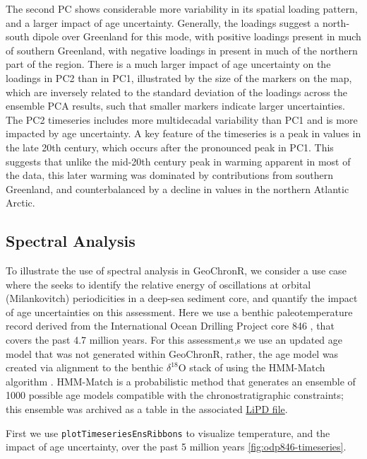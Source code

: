 \documentclass[gchron, manuscript]{copernicus}
\begin{document}
The second PC shows considerable more variability in its spatial loading pattern, and a larger impact of age uncertainty.
Generally, the loadings suggest a north-south dipole over Greenland for this mode, with positive loadings present in much of southern Greenland, with negative loadings in present in much of the northern part of the region.
There is a much larger impact of age uncertainty on the loadings in PC2 than in PC1, illustrated by the size of the markers on the map, which are inversely related to the standard deviation of the loadings across the ensemble PCA results, such that smaller markers indicate larger uncertainties.
The PC2 timeseries includes more multidecadal variability than PC1 and is more impacted by age uncertainty.
A key feature of the timeseries is a peak in values in the late 20th century, which occurs after the pronounced peak in PC1.
This suggests that unlike the mid-20th century peak in warming apparent in most of the data, this later warming was dominated by contributions from southern Greenland, and counterbalanced by a decline in values in the northern Atlantic Arctic.

\hypertarget{sec:spec_vignette}{%
\subsection{Spectral Analysis}\label{sec:spec_vignette}}

To illustrate the use of spectral analysis in GeoChronR, we consider a use case where the seeks to identify the relative energy of oscillations at orbital (Milankovitch) periodicities in a deep-sea sediment core, and quantify the impact of age uncertainties on this assessment.
Here we use a benthic paleotemperature record derived from the International Ocean Drilling Project core 846 \citep[\citet{Shackleton95}]{mix1995benthic}, that covers the past 4.7 million years.
For this assessment,s we use an updated age model that was not generated within GeoChronR, rather, the age model was created via alignment to the benthic \(\delta^{18}\mathrm{O}\) stack of \citet{LisieckiRaymo05} using the HMM-Match algorithm \citep[\citet{Khider_2017}]{ProbStack}.
HMM-Match is a probabilistic method that generates an ensemble of 1000 possible age models compatible with the chronostratigraphic constraints; this ensemble was archived as a table in the associated \href{http://lipdverse.org/geoChronR-examples/ODP846.Lawrence.2006.lpd}{LiPD file}.

First we use \texttt{plotTimeseriesEnsRibbons} to visualize temperature, and the impact of age uncertainty, over the past 5 million years \ref{fig:odp846-timeseries}.
\end{document}
